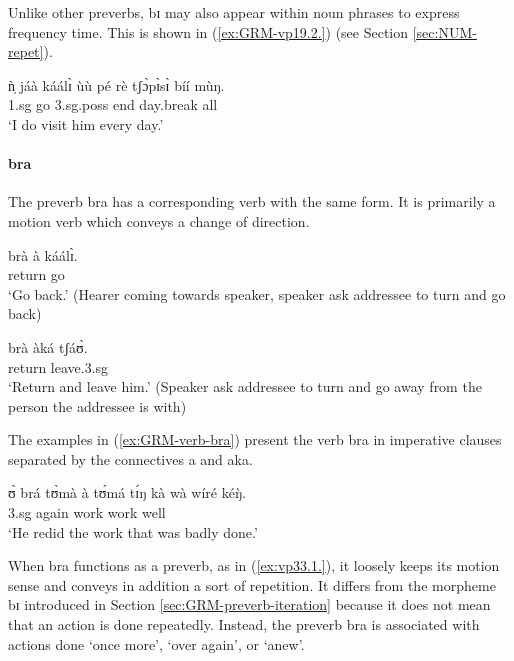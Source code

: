 \begin{exe}
\begin{exe}
\begin{exe}
{\begin{exe}
\begin{exe}
\begin{exe}
\begin{exe}
\begin{exe}
\begin{exe}
\begin{exe}
\begin{exe}
\begin{exe}
\begin{exe}
\begin{exe}
\begin{exe}
\begin{exe}
\begin{exe}
\begin{exe}
\begin{exe}
\begin{exe}
\begin{exe}
\begin{exe}
\begin{exe}
\z 
 \z 


Unlike other preverbs,  {\sls bɪ} may also appear within noun phrases to express
frequency time. This is shown in (\ref{ex:GRM-vp19.2.}) (see Section
\ref{sec:NUM-repet}).



\begin{exe} 
\ex\label{ex:GRM-vp19.2.}
\gll  ǹ̩ jáà  káálɪ̀ ùù pé rè tʃɔ̀pɪ̀sɪ̀ bíí mùŋ.\\
{\sc 1.sg} {\hab} go {\sc 3.sg.poss} end {\foc}  day.break {\itr} all\\
\glt  `I do visit him every day.' 

\z 



 \paragraph{bra}
\label{sec:GRM-preverb-return}

The preverb {\sls bra} has a corresponding verb with the same form. It is
primarily a motion verb which conveys a change of direction. 


\ea\label{ex:GRM-verb-bra}

\ea
\gll brà à káálɪ̀.\\
return {\conn} go\\
\glt `Go back.' (Hearer coming towards speaker, speaker ask addressee to turn 
and 
go back)

\ex
\gll brà àká tʃáʊ̀.\\
return {\conn} leave.{\sc 3.sg}\\
\glt `Return and leave him.' (Speaker ask addressee to turn and go away from 
the 
person the addressee is with)

\z 
 \z

The examples 
in (\ref{ex:GRM-verb-bra}) present the verb {\sls bra} in imperative clauses
separated by the connectives {\sls a} and {\sls aka}. 

\ea\label{ex:vp33.1.}
\gll ʊ̀ brá tʊ̀mà à tʊ́má tɪ́ŋ kà wà wíré kéŋ̀.\\
 {\sc 3.sg}  {again}  {work} {\art} {work}   {\art} {\egr} {\neg} well {\advm}\\
\glt  `He redid the work that was badly done.'
\z


When {\sls bra} functions as 
a preverb, as in (\ref{ex:vp33.1.}),  it loosely keeps its motion sense and
conveys in addition a sort of repetition. It differs from the morpheme {\sls bɪ}
introduced in
 Section \ref{sec:GRM-preverb-iteration} because it does not mean that an
action is
done
repeatedly.  Instead, the preverb {\sls bra} is associated with actions done 
`once
more', `over again',  or `anew'.


\end{exe}
\end{exe}
\end{exe}
\end{exe}
\end{exe}
\end{exe}
\end{exe}
\end{exe}
\end{exe}
\end{exe}
\end{exe}
\end{exe}
\end{exe}
\end{exe}
\end{exe}
\end{exe}
\end{exe}
\end{exe}
\end{exe}
\end{exe}
\end{exe}}
\end{exe}
\end{exe}
\end{exe}
